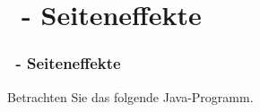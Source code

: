 \def\stitle{\theexercise\ - Seiteneffekte}
\section{\stitle}
\begin{frame}[t]%
    \frametitle{\stitle}

Betrachten Sie das folgende Java-Programm.
  

\end{frame}